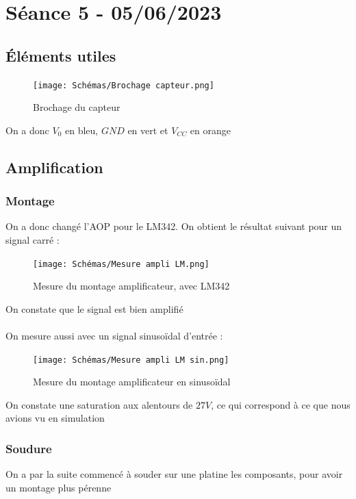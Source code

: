 \documentclass[11pt,a4paper]{article}
\begin{document}
\section{Séance 5 - 05/06/2023}
\subsection{Éléments utiles}
\begin{figure} [H]
\begin{center}
\texttt{[image: Schémas/Brochage capteur.png]} 
\end{center}
\caption{Brochage du capteur}
\end{figure}

On a donc $V_0$ en bleu, $GND$ en vert et $V_{CC}$ en orange

\subsection{Amplification}
\subsubsection{Montage}
\begin{multicols}{2}
On a donc changé l'AOP pour le LM342. On obtient le résultat suivant pour un signal carré :
\begin{figure} [H]
\begin{center}
\texttt{[image: Schémas/Mesure ampli LM.png]} 
\end{center}
\caption{Mesure du montage amplificateur, avec LM342}
\end{figure}

On constate que le signal est bien amplifié\\\\

On mesure aussi avec un signal sinusoïdal d'entrée :
\begin{figure} [H]
\begin{center}
\texttt{[image: Schémas/Mesure ampli LM sin.png]} 
\end{center}
\caption{Mesure du montage amplificateur en sinusoïdal}
\end{figure}

On constate une saturation aux alentours de $27V$, ce qui correspond à ce que nous avions vu en simulation
\end{multicols}

\subsubsection{Soudure}
On a par la suite commencé à souder sur une platine les composants, pour avoir un montage plus pérenne
\end{document}
